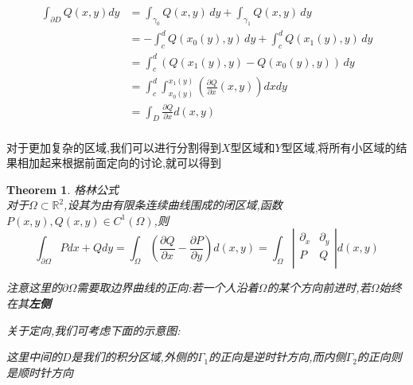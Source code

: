 \documentclass[11pt,hyperref,a4paper,UTF8]{ctexart}
\newtheorem{theorem}{Theorem}[subsection]
\newcommand{\RR}{\mathbb{R}}
\newcommand{\parameter}[1]{\left(#1\right)}
\begin{document}
\begin{CJK}{UTF8}{gkai}
\[
  \begin{aligned}
    \int_{\partial D} Q(x,y)dy &= \int_{\gamma_0}Q(x,y)\, dy + \int_{\gamma_1}Q(x,y)\, dy\\
    &= -\int_{c}^d Q(x_0(y),y)\, dy + \int_c^d Q(x_1(y),y)\, dy\\
    &= \int_{c}^d \parameter{Q(x_1(y),y) - Q(x_0(y),y)}\, dy \\
    &= \int_c^d \int_{x_0(y)}^{x_1(y)} \parameter{\frac{\partial Q}{\partial x}(x,y)}dx dy\\
    &= \int_D \frac{\partial Q}{\partial x}d(x,y)\\
  \end{aligned}
  \]

对于更加复杂的区域,我们可以进行分割得到$X$型区域和$Y$型区域,将所有小区域的结果相加起来根据前面定向的讨论,就可以得到

\begin{theorem}
  格林公式\\

  对于$\Omega \subset \RR^2$,设其为由有限条连续曲线围成的闭区域,函数$P(x,y),Q(x,y) \in C^1(\Omega)$,则
  \[\int_{\partial \Omega} Pdx + Qdy = \int_{\Omega} \parameter{\frac{\partial Q}{\partial x} - \frac{\partial P}{\partial y}} d(x,y) = \int_{\Omega} \left|\begin{matrix}
    \partial_x & \partial_y\\
    P & Q\\
  \end{matrix}\right| d(x,y)\]

  注意这里的$\partial \Omega$需要取边界曲线的正向:若一个人沿着$\Omega$的某个方向前进时,若$\Omega$始终在其\textbf{左侧}

  关于定向,我们可考虑下面的示意图:
  \begin{center}
\end{center}
这里中间的$D$是我们的积分区域,外侧的$\Gamma_1$的正向是逆时针方向,而内侧$\Gamma_2$的正向则是顺时针方向
\end{theorem}


\end{CJK}
\end{document}
